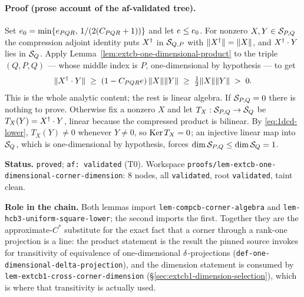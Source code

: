 \paragraph{Proof (prose account of the af-validated tree).}
Set $e_0=\min\{e_{PQR},\,1/(2(C_{PQR}+1))\}$ and let
$e\le e_0$. For nonzero $X,Y\in\mathcal S_{P,Q}$ the compression adjoint identity puts
$X^{\dagger}$ in $\mathcal S_{Q,P}$ with $\lVert X^{\dagger}\rVert=\lVert X\rVert$, and $X^{\dagger}\mathbin{\cdot} Y$ lies in $\mathcal S_{Q}$.
Apply Lemma~\ref{lem:extcb-one-dimensional-product} to the triple $(Q,P,Q)$ --- whose
middle index is $P$, one-dimensional by hypothesis --- to get
\begin{equation}\label{eq:1dcd-lower}
  \lVert X^{\dagger}\mathbin{\cdot} Y\rVert\;\ge\;(1-C_{PQR}e)\,\lVert X\rVert\lVert Y\rVert\;\ge\;\tfrac12\lVert X\rVert\lVert Y\rVert\;>\;0 .
\end{equation}
This is the whole analytic content; the rest is linear algebra. If $\mathcal S_{P,Q}=0$ there is
nothing to prove. Otherwise fix a nonzero $X$ and let $T_X:\mathcal S_{P,Q}\to\mathcal S_{Q}$ be
$T_X(Y)=X^{\dagger}\mathbin{\cdot} Y$, linear because the compressed product is bilinear. By
\eqref{eq:1dcd-lower}, $T_X(Y)\ne0$ whenever $Y\ne0$, so $\operatorname{Ker} T_X=0$; an injective linear
map into $\mathcal S_{Q}$, which is one-dimensional by hypothesis, forces
$\dim\mathcal S_{P,Q}\le\dim\mathcal S_{Q}=1$.

\medskip
\noindent\textbf{Status.} \texttt{proved}; \texttt{af: validated} (T0). Workspace
\texttt{proofs/lem-extcb-one-dimensional-corner-dimension}: 8 nodes, all
\texttt{validated}, root \texttt{validated}, taint clean.

\noindent\textbf{Role in the chain.} Both lemmas import
\texttt{lem-compcb-corner-algebra} and \texttt{lem-hcb3-uniform-square-lower}; the second
imports the first. Together they are the approximate-$C^*$ substitute for the exact fact
that a corner through a rank-one projection is a line: the product statement is the
result the pinned source invokes for transitivity of equivalence of one-dimensional
$\delta$-projections (\texttt{def-one-dimensional-delta-projection}), and the dimension
statement is consumed by \texttt{lem-extcb1-cross-corner-dimension}
(\S\ref{sec:extcb1-dimension-selection}), which is where that transitivity is actually
used.
